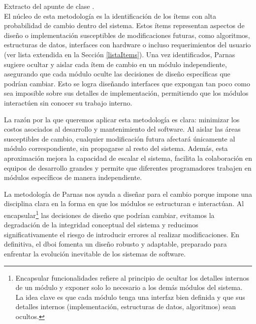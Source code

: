 \noindent{} 
Extracto del apunte de clase \cite{cristia2022diseno}.
\\
\indent
El núcleo de esta metodología es la identificación de los ítems con alta probabilidad de cambio dentro del sistema. Estos ítems representan aspectos de diseño o implementación susceptibles de modificaciones futuras, como algoritmos, estructuras de datos, interfaces con hardware o incluso requerimientos del usuario (ver lista extendida en la Sección \ref{listaItems}). Una vez identificados, Parnas sugiere ocultar y aislar cada ítem de cambio en un módulo independiente, asegurando que cada módulo oculte las decisiones de diseño específicas que podrían cambiar. Esto se logra diseñando interfaces que expongan tan poco como sea imposible sobre sus detalles de implementación, permitiendo que los módulos interactúen sin conocer su trabajo interno. 

La razón por la que queremos aplicar esta metodología es clara: minimizar los costos asociados al desarrollo y mantenimiento del software. Al aislar las áreas susceptibles de cambio, cualquier modificación futura afectará únicamente al módulo correspondiente, sin propagarse al resto del sistema. Además, esta aproximación mejora la capacidad de escalar el sistema, facilita la colaboración en equipos de desarrollo grandes y permite que diferentes programadores trabajen en módulos específicos de manera independiente.

La metodología de Parnas nos ayuda a diseñar para el cambio porque impone una disciplina clara en la forma en que los módulos se estructuran e interactúan. Al encapsular\footnote{Encapsular funcionalidades refiere al principio de ocultar los detalles internos de un módulo y exponer solo lo necesario a los demás módulos del sistema. La idea clave es que cada módulo tenga una interfaz bien definida y que sus detalles internos (implementación, estructuras de datos, algoritmos) sean ocultos.} las decisiones de diseño que podrían cambiar, evitamos la degradación de la integridad conceptual del sistema y reducimos significativamente el riesgo de introducir errores al realizar modificaciones. En definitiva, el \gls{dboi} fomenta un diseño robusto y adaptable, preparado para enfrentar la evolución inevitable de los sistemas de software.


